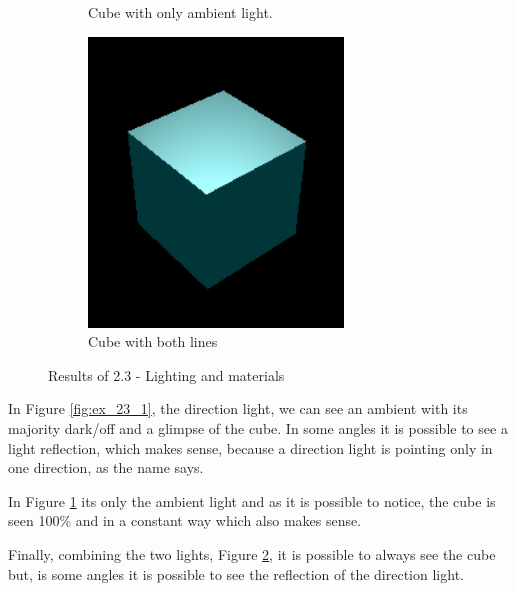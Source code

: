 \documentclass[12pt]{article}
\begin{document}
\begin{figure}[!h]
\begin{subfigure}{.33\textwidth}
        \caption{Cube with only ambient light.}
        \label{fig:ex_23_2}
    \end{subfigure}
    \begin{subfigure}{.33\textwidth}
        \centering
        \includegraphics[width = \textwidth]{figs/ex_23_3.png}
        \caption{Cube with both lines}
        \label{fig:ex_23_3}
    \end{subfigure}
\caption{Results of 2.3 - Lighting and materials}
\label{fig:ex_23}
\end{figure}

In Figure \ref{fig:ex_23_1}, the direction light, we can see an ambient with its majority dark/off and a glimpse of the cube. In some angles it is possible to see a light reflection, which makes sense, because a direction light is pointing only in one direction, as the name says.\par

In Figure \ref{fig:ex_23_2} its only the ambient light and as it is possible to notice, the cube is seen 100\% and in a constant way which also makes sense.\par

Finally, combining the two lights, Figure \ref{fig:ex_23_3}, it is possible to always see the cube but, is some angles it is possible to see the reflection of the direction light.
\end{document}
